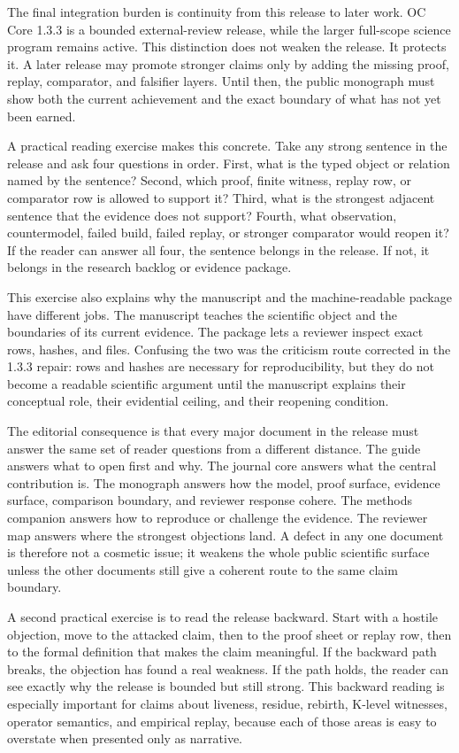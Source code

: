 The final integration burden is continuity from this release to later work. OC Core 1.3.3 is a bounded external-review release, while the larger full-scope science program remains active. This distinction does not weaken the release. It protects it. A later release may promote stronger claims only by adding the missing proof, replay, comparator, and falsifier layers. Until then, the public monograph must show both the current achievement and the exact boundary of what has not yet been earned.


A practical reading exercise makes this concrete. Take any strong sentence in the release and ask four questions in order. First, what is the typed object or relation named by the sentence? Second, which proof, finite witness, replay row, or comparator row is allowed to support it? Third, what is the strongest adjacent sentence that the evidence does not support? Fourth, what observation, countermodel, failed build, failed replay, or stronger comparator would reopen it? If the reader can answer all four, the sentence belongs in the release. If not, it belongs in the research backlog or evidence package.


This exercise also explains why the manuscript and the machine-readable package have different jobs. The manuscript teaches the scientific object and the boundaries of its current evidence. The package lets a reviewer inspect exact rows, hashes, and files. Confusing the two was the criticism route corrected in the 1.3.3 repair: rows and hashes are necessary for reproducibility, but they do not become a readable scientific argument until the manuscript explains their conceptual role, their evidential ceiling, and their reopening condition.


The editorial consequence is that every major document in the release must answer the same set of reader questions from a different distance. The guide answers what to open first and why. The journal core answers what the central contribution is. The monograph answers how the model, proof surface, evidence surface, comparison boundary, and reviewer response cohere. The methods companion answers how to reproduce or challenge the evidence. The reviewer map answers where the strongest objections land. A defect in any one document is therefore not a cosmetic issue; it weakens the whole public scientific surface unless the other documents still give a coherent route to the same claim boundary.


A second practical exercise is to read the release backward. Start with a hostile objection, move to the attacked claim, then to the proof sheet or replay row, then to the formal definition that makes the claim meaningful. If the backward path breaks, the objection has found a real weakness. If the path holds, the reader can see exactly why the release is bounded but still strong. This backward reading is especially important for claims about liveness, residue, rebirth, K-level witnesses, operator semantics, and empirical replay, because each of those areas is easy to overstate when presented only as narrative.


